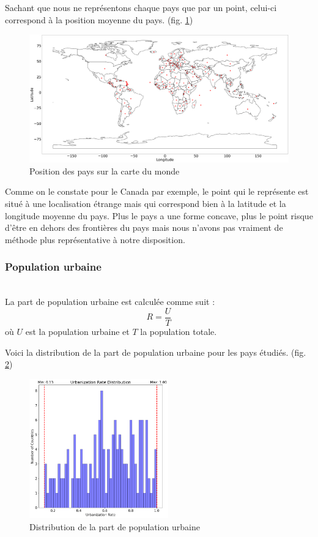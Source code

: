 \documentclass[12pt]{iEEEtran}
\begin{document}
Sachant que nous ne représentons chaque pays que par un point, celui-ci correspond
à la position moyenne du pays. (fig. \ref{fig:loc_world})

\begin{figure}[h]
    \centering
    \includegraphics[width=\columnwidth]{img/loc_world.png}
    \caption{Position des pays sur la carte du monde}
    \label{fig:loc_world}
\end{figure}

Comme on le constate pour le Canada par exemple, le point qui le représente est situé
à une localisation étrange mais qui correspond bien à la latitude et la longitude moyenne
du pays. Plus le pays a une forme concave, plus le point risque d'être en dehors des
frontières du pays mais nous n'avons pas vraiment de méthode plus représentative à notre
disposition.
\\

\subsubsection{Population urbaine}\hfill\\

La part de population urbaine est calculée comme suit :
$$ R = \frac{U}{T} $$ où $U$ est la population urbaine et $T$ la population totale.

Voici la distribution de la part de population urbaine pour les pays étudiés. (fig. \ref{fig:urb_rate})

\begin{figure}[h]
    \centering
    \includegraphics[width=6cm]{img/urb_rate.png}
    \caption{Distribution de la part de population urbaine}
    \label{fig:urb_rate}
\end{figure}
\end{document}
